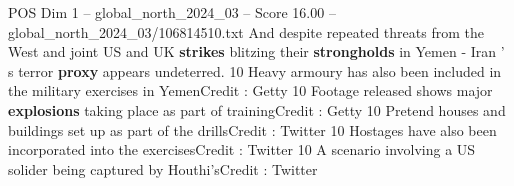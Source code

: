 \begin{textsample}{POS Dim 1 – global\_north\_2024\_03 – Score 16.00 – global\_north\_2024\_03/106814510.txt}
And despite repeated threats from the West and joint US and UK \textbf{strikes} blitzing their \textbf{strongholds} in Yemen - Iran ' s terror \textbf{proxy} appears undeterred. 10 Heavy armoury has also been included in the military exercises in YemenCredit : Getty 10 Footage released shows major \textbf{explosions} taking place as part of trainingCredit : Getty 10 Pretend houses and buildings set up as part of the drillsCredit : Twitter 10 Hostages have also been incorporated into the exercisesCredit : Twitter 10 A scenario involving a US solider being captured by Houthi'sCredit : Twitter

\end{textsample}
